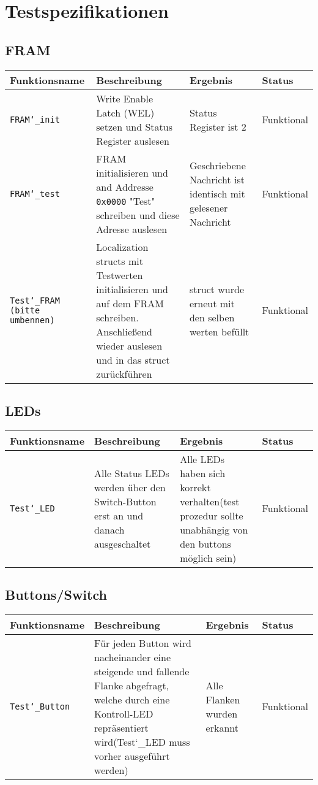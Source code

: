\documentclass{article}
\begin{document}
	\section{Testspezifikationen}
	\subsection{FRAM}
		\begin{tabular}{|p{3.2cm}|p{5.5cm}|p{4cm}| p{1.6cm} |}
			\hline
				\textbf{Funktionsname} & \textbf{Beschreibung} & \textbf{Ergebnis} & \textbf{Status} \\
			\hline
				\texttt{FRAM\char`_init} & Write Enable Latch (WEL) setzen und Status Register auslesen & Status Register ist 2 & Funktional \\
			\hline
				\texttt{FRAM\char`_test} & FRAM initialisieren und and Addresse \texttt{0x0000} "Test" schreiben und diese Adresse auslesen & Geschriebene Nachricht ist identisch mit gelesener Nachricht & Funktional\\
			\hline
				\texttt{Test\char`_FRAM (bitte umbennen)} & Localization structs mit Testwerten initialisieren und auf dem FRAM schreiben. Anschließend wieder auslesen und in das struct zurückführen & struct wurde erneut mit den selben werten befüllt & Funktional \\
			\hline
		\end{tabular}
	\subsection{LEDs}
		\begin{tabular}{|p{3.2cm}|p{5.5cm}|p{4cm}| p{1.6cm} |}
			\hline
				\textbf{Funktionsname} & \textbf{Beschreibung} & \textbf{Ergebnis} & \textbf{Status} \\
			\hline
				 \texttt{Test\char`_LED} & Alle Status LEDs werden über den Switch-Button erst an und danach ausgeschaltet & Alle LEDs haben sich korrekt verhalten(test prozedur sollte unabhängig von den buttons möglich sein) & Funktional \\
			\hline
		\end{tabular}
		\subsection{Buttons/Switch}
	\begin{tabular}{|p{3.2cm}|p{5.5cm}|p{4cm}| p{1.6cm} |}
		\hline
			\textbf{Funktionsname} & \textbf{Beschreibung} & \textbf{Ergebnis} & \textbf{Status} \\
		\hline
			 \texttt{Test\char`_Button} & Für jeden Button wird nacheinander eine steigende und fallende Flanke abgefragt, welche durch eine Kontroll-LED repräsentiert wird(Test\char`_LED muss vorher ausgeführt werden) & Alle Flanken wurden erkannt & Funktional \\
		\hline
	\end{tabular}
\end{document}
